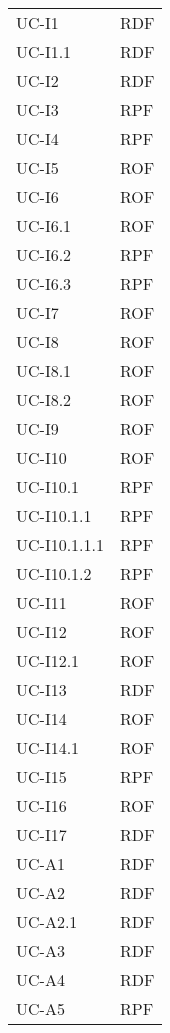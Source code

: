 \begin{longtable}{| p{5cm} | p{5cm} |}
		UC-I1 & RDF \\
		UC-I1.1 & RDF \\
		UC-I2 & RDF \\
		\rowcolor{LightGray}
		UC-I3 & RPF \\
		UC-I4 & RPF \\
		UC-I5 & ROF\\
		UC-I6 & ROF \\
		\rowcolor{LightGray}
		UC-I6.1 & ROF \\
		UC-I6.2 & RPF \\
		\rowcolor{LightGray}
		UC-I6.3 & RPF \\
		UC-I7 & ROF\\
		UC-I8 & ROF \\
		UC-I8.1 & ROF \\
		UC-I8.2 & ROF \\
		UC-I9 & ROF \\
		\rowcolor{LightGray}
		UC-I10 & ROF \\
		UC-I10.1 & RPF \\
		\rowcolor{LightGray}
		UC-I10.1.1 & RPF\\
		UC-I10.1.1.1 & RPF \\
		UC-I10.1.2 & RPF \\
		UC-I11 & ROF \\
		UC-I12 & ROF \\
		UC-I12.1 & ROF \\
		UC-I13 & RDF \\
		UC-I14 & ROF \\
		UC-I14.1 & ROF \\
		UC-I15 & RPF \\
		UC-I16 & ROF \\
		UC-I17 & RDF \\
		\rowcolor{LightGray}
		
		UC-A1 & RDF\\
		UC-A2 & RDF \\
		UC-A2.1 & RDF \\
		UC-A3 & RDF\\
		UC-A4 & RDF \\
		UC-A5 & RPF\\
		

\end{longtable}
